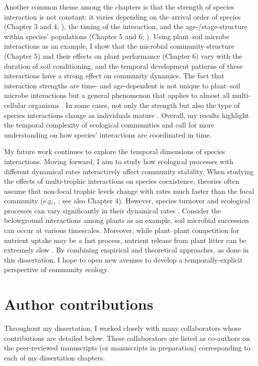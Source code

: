 Another common theme among the chapters is that the strength of species interaction is not constant: it varies depending on the arrival order of species (Chapter 3 and 4; \citealp{Fukami2015, Duhamel2019}), the timing of the interaction, and the age-/stage-structure within species' populations (Chapter 5 and 6; \citealp{Kardol2013Oikos, Peay2018}). Using plant--soil microbe interactions as an example, I show that the microbial community structure (Chapter 5) and their effects on plant performance (Chapter 6) vary with the duration of soil conditioning, and the temporal development patterns of these interactions have a strong effect on community dynamics. The fact that interaction strengths are time- and age-dependent is not unique to plant--soil microbe interactions but a general phenomenon that applies to almost all multi-cellular organisms \citep{Miller2011, deRoos2013, Nakazawa2015}. In some cases, not only the strength but also the type of species interactions change as individuals mature \citep{Yang2010, KeNakazawa2018}. Overall, my results highlight the temporal complexity of ecological communities and call for more understanding on how species' interactions are coordinated in time.
\par


My future work continues to explore the temporal dimensions of species interactions. Moving forward, I aim to study how ecological processes with different dynamical rates interactively affect community stability. When studying the effects of multi-trophic interactions on species coexistence, theories often assume that non-focal trophic levels change with rates much faster than the focal community (e.g., \citealp{Chesson2008}; see also Chapter 4). However, species turnover and ecological processes can vary significantly in their dynamical rates \citep{Rinaldi2000, Menge2012, LiChesson2016}. Consider the belowground interactions among plants as an example, soil microbial succession can occur at various timescales. Moreover, while plant--plant competition for nutrient uptake may be a fast process, nutrient release from plant litter can be extremely slow \citep{Menge2008}. By combining empirical and theoretical approaches, as done in this dissertation, I hope to open new avenues to develop a temporally-explicit perspective of community ecology.
\par



\section{Author contributions}
Throughout my dissertation, I worked closely with many collaborators whose contributions are detailed below. These collaborators are listed as co-authors on the peer-reviewed manuscripts (or manuscripts in preparation) corresponding to each of my dissertation chapters.
\par


